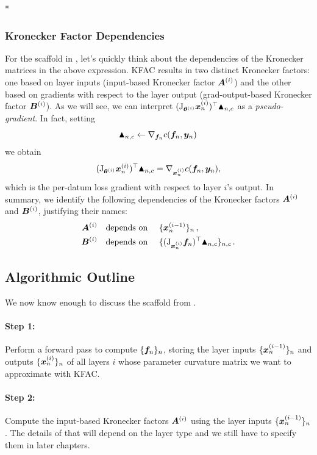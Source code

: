 \switchcolumn[1]*
\switchcolumn[0]

\subsubsection{Kronecker Factor Dependencies}

For the scaffold in , let's quickly think about the dependencies of the Kronecker matrices in the above expression.
KFAC results in two distinct Kronecker factors: one based on layer inputs (input-based Kronecker factor ${\bm{A}}^{(i)}$) and the other based on gradients with respect to the layer output (grad-output-based Kronecker factor ${\bm{B}}^{(i)}$).
As we will see, we can interpret $(\mathrm{J}_{{\bm{\theta}}^{(i)}} {\bm{x}}_n^{(i)})^{\top} \blacktriangle_{n,c}$ as a \emph{pseudo-gradient}.
In fact, setting
$$\blacktriangle_{n,c} \leftarrow \nabla_{{\bm{f}}_n} c({\bm{f}}_n, {\bm{y}}_n)\,$$
we obtain
$$(\mathrm{J}_{{\bm{\theta}}^{(i)}} {\bm{x}}_n^{(i)})^{\top} \blacktriangle_{n,c} = \nabla_{{\bm{x}}_n^{(i)}} c({\bm{f}}_n, {\bm{y}}_n),$$
which is the per-datum loss gradient with respect to layer $i$'s output.
In summary, we identify the following dependencies of the Kronecker factors ${\bm{A}}^{(i)}$ and ${\bm{B}}^{(i)}$, justifying their names:
\begin{align*}
  {\bm{A}}^{(i)} &\text{\quad depends on \quad} \{{\bm{x}}_{n}^{(i-1)}\}_n \,,
  \\
  {\bm{B}}^{(i)} &\text{\quad depends on \quad} \{ (\mathrm{J}_{{\bm{x}}_n^{(i)}}{\bm{f}}_{n})^{\top} \blacktriangle_{n,c}\}_{n,c}\,.
\end{align*}

\subsection{Algorithmic Outline}

We now know enough to discuss the scaffold from .

\paragraph{Step 1:} Perform a forward pass to compute $\{{\bm{f}}_n\}_n $, storing the layer inputs $\{{\bm{x}}_n^{(i-1)} \}_n$ and outputs $\{{\bm{x}}_n^{(i)}\}_n$ of all layers $i$ whose parameter curvature matrix we want to approximate with KFAC.

\paragraph{Step 2:} Compute the input-based Kronecker factors ${\bm{A}}^{(i)}$ using the layer inputs $\{{\bm{x}}_n^{(i-1)}\}_n$.
The details of that will depend on the layer type and we still have to specify them in later chapters.

